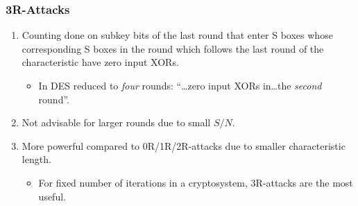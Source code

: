 \documentclass{beamer}
\begin{document}
    \begin{frame}
        \frametitle{3R-Attacks}
        \begin{enumerate}
            \item<1-> Counting done on subkey bits of the last round that enter
            S boxes whose corresponding S boxes in the round which follows the
            last round of the characteristic have zero input XORs.
            \begin{itemize}
                \item<2-> In DES reduced to \emph{four} rounds: ``\dots zero
                input XORs in\dots the \emph{second} round''.
            \end{itemize}
            \item<3-> Not advisable for larger rounds due to small \(S/N\).
            \item<4-> More powerful compared to 0R/1R/2R-attacks due to smaller
            characteristic length.
            \begin{itemize}
                \item For fixed number of iterations in a cryptosystem,
                3R-attacks are the most useful.
            \end{itemize}
        \end{enumerate}
    \end{frame}
\end{document}
